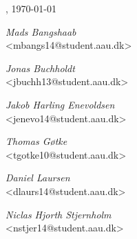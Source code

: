 \vspace{\baselineskip}\hfill \AAU, \today
\vfill\noindent
\begin{center}
\begin{minipage}[b]{0.45\textwidth}
 \centering
  \textit{Mads Bangshaab}\\
 {\footnotesize <mbangs14@student.aau.dk>}
\end{minipage}
\hspace{0.3cm}
\begin{minipage}[b]{0.45\textwidth}
 \centering
  \textit{Jonas Buchholdt}\\
 {\footnotesize <jbuchh13@student.aau.dk>}
\end{minipage}
\end{center}
\vspace{1\baselineskip}
\begin{center}
\begin{minipage}[b]{0.45\textwidth}
 \centering
  \textit{Jakob Harling Enevoldsen}\\
 {\footnotesize <jenevo14@student.aau.dk>}
\end{minipage}
\hspace{0.3cm}
\begin{minipage}[b]{0.45\textwidth}
 \centering
  \textit{Thomas Gøtke}\\
 {\footnotesize <tgotke10@student.aau.dk>}
\end{minipage}
\end{center}
\vspace{1\baselineskip}
\begin{center}
\begin{minipage}[b]{0.45\textwidth}
 \centering
  \textit{Daniel Laursen}\\
 {\footnotesize <dlaurs14@student.aau.dk>}
\end{minipage}
\hspace{0.3cm}
\begin{minipage}[b]{0.45\textwidth}
 \centering
  \textit{Niclas Hjorth Stjernholm}\\
 {\footnotesize <nstjer14@student.aau.dk>}
\end{minipage}
\end{center}
